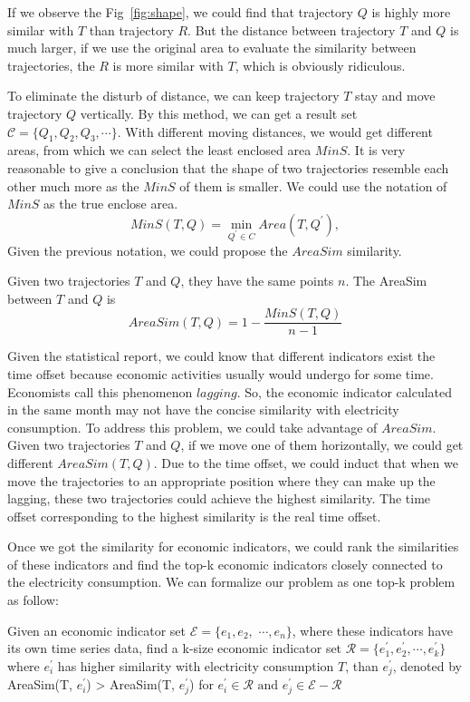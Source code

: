 If we observe the Fig~\ref{fig:shape}, we could find that trajectory $Q$ is highly more similar with $T$ than trajectory $R$. But the distance between trajectory $T$ and $Q$ is much larger, if we use the original area to evaluate the similarity between trajectories, the $R$ is more similar with $T$, which is obviously ridiculous. 
 
To eliminate the disturb of distance, we can keep trajectory $T$ stay and move trajectory $Q$ vertically. By this method, we can get a result set $\mathcal{C} = \{Q_1, Q_2, Q_3, \cdots\}$. With different moving distances, we would get different areas, from which we can select the least enclosed area $MinS$. It is very reasonable to give a conclusion that the shape of two trajectories resemble each other much more as the $MinS$ of them is smaller. We could use the notation of $MinS$ as the true enclose area.
\begin{equation}\label{eq:mins}
MinS(T, Q)=\min_{Q^{\prime}\in C} Area(T, Q^{\prime}),
\end{equation}
Given the previous notation, we could propose the $AreaSim$ similarity.
\begin{definition}
	Given two trajectories $T$ and $Q$, they have the same points $n$. The AreaSim between $T$ and $Q$ is 
	\begin{equation} \label{eq:simdef}
		AreaSim(T, Q) = 1 - \frac{MinS(T, Q)}{n - 1}
	\end{equation} 
\end{definition}

Given the statistical report, we could know that different indicators exist the time offset because economic activities usually would undergo for some time. Economists call this phenomenon $lagging$. So, the economic indicator calculated in the same month may not have the concise similarity with electricity consumption. To address this problem, we could take advantage of $AreaSim$. Given two trajectories $T$ and $Q$, if we move one of them horizontally, we could get different $AreaSim(T, Q)$. Due to the time offset, we could induct that when we move the trajectories to an appropriate position where they can make up the lagging, these two trajectories could achieve the highest similarity. The time offset corresponding to the highest similarity is the real time offset. 

Once we got the similarity for economic indicators, we could rank the similarities of these indicators and find the top-k economic indicators closely connected to the electricity consumption. We can formalize our problem as one top-k problem as follow:
\begin{definition}
	Given an economic indicator set $\mathcal{E}=\{e_1, e_2,$ $\cdots, e_n\}$, where these indicators have its own time series data, find a k-size economic indicator set $\mathcal{R}=\{e^{\prime}_1, e^{\prime}_2, \cdots, e^{\prime}_k\}$ where $e^{\prime}_i$ has higher similarity with electricity consumption $T$, than $e^{\prime}_j$, denoted by AreaSim(T, $e^{\prime}_i$) > AreaSim(T, $e^{\prime}_j$) for $e^{\prime}_i \in \mathcal{R} \text{ and } e^{\prime}_j \in \mathcal{E} - \mathcal{R}$
\end{definition}
